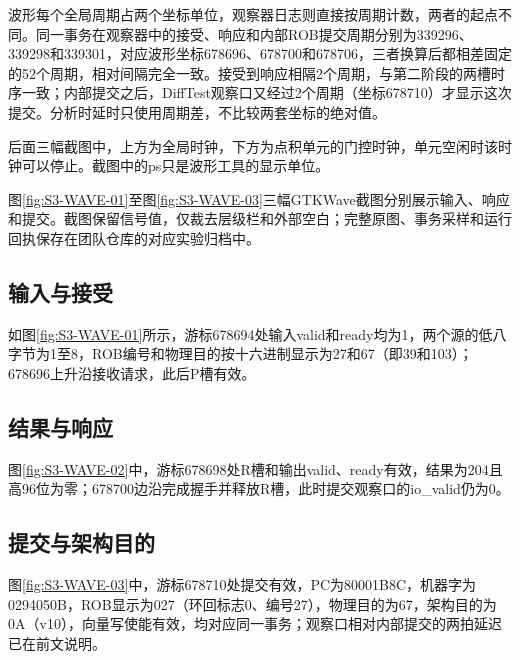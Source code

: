 波形每个全局周期占两个坐标单位，观察器日志则直接按周期计数，两者的起点不同。同一事务在观察器中的接受、响应和内部ROB提交周期分别为339296、339298和339301，对应波形坐标678696、678700和678706，三者换算后都相差固定的52个周期，相对间隔完全一致。接受到响应相隔2个周期，与第二阶段的两槽时序一致；内部提交之后，DiffTest观察口又经过2个周期（坐标678710）才显示这次提交。分析时延时只使用周期差，不比较两套坐标的绝对值。

后面三幅截图中，上方为全局时钟，下方为点积单元的门控时钟，单元空闲时该时钟可以停止。截图中的ps只是波形工具的显示单位。

图\ref{fig:S3-WAVE-01}至图\ref{fig:S3-WAVE-03}三幅GTKWave截图分别展示输入、响应和提交。截图保留信号值，仅裁去层级栏和外部空白；完整原图、事务采样和运行回执保存在团队仓库的对应实验归档中。

\subsection{输入与接受}
如图\ref{fig:S3-WAVE-01}所示，游标678694处输入valid和ready均为1，两个源的低八字节为1至8，ROB编号和物理目的按十六进制显示为27和67（即39和103）；678696上升沿接收请求，此后P槽有效。

\subsection{结果与响应}
图\ref{fig:S3-WAVE-02}中，游标678698处R槽和输出valid、ready有效，结果为204且高96位为零；678700边沿完成握手并释放R槽，此时提交观察口的io\_valid仍为0。

\subsection{提交与架构目的}
图\ref{fig:S3-WAVE-03}中，游标678710处提交有效，PC为80001B8C，机器字为0294050B，ROB显示为027（环回标志0、编号27），物理目的为67，架构目的为0A（v10），向量写使能有效，均对应同一事务；观察口相对内部提交的两拍延迟已在前文说明。

